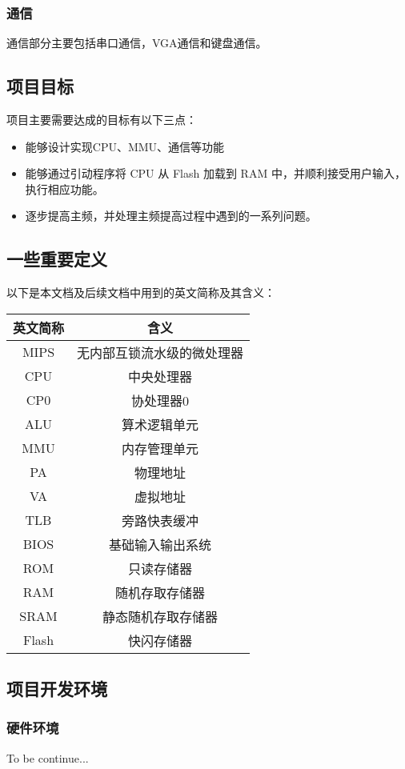 \documentclass[11pt,utf8]{article}
\begin{document}
\subsubsection{通信}
通信部分主要包括串口通信，VGA通信和键盘通信。

\subsection{项目目标}
项目主要需要达成的目标有以下三点：
\begin{itemize}
\item 能够设计实现CPU、MMU、通信等功能
\item 能够通过引动程序将 CPU 从 Flash 加载到 RAM 中，并顺利接受用户输入，执行相应功能。
\item 逐步提高主频，并处理主频提高过程中遇到的一系列问题。
\end{itemize}

\subsection{一些重要定义}
以下是本文档及后续文档中用到的英文简称及其含义：
\begin{center}
\begin{tabular}{|c|c|}
\hline
\textbf{英文简称} & \textbf{含义} \\
\hline
MIPS & 无内部互锁流水级的微处理器 \\
CPU & 中央处理器 \\
CP0 & 协处理器0 \\
ALU & 算术逻辑单元 \\
MMU & 内存管理单元 \\
PA & 物理地址 \\
VA & 虚拟地址 \\
TLB & 旁路快表缓冲 \\
BIOS & 基础输入输出系统 \\
ROM & 只读存储器 \\
RAM & 随机存取存储器 \\
SRAM & 静态随机存取存储器 \\
Flash & 快闪存储器 \\
\hline
\end{tabular}
\end{center}
\subsection{项目开发环境}
\subsubsection{硬件环境}
To be continue...
\end{document}
